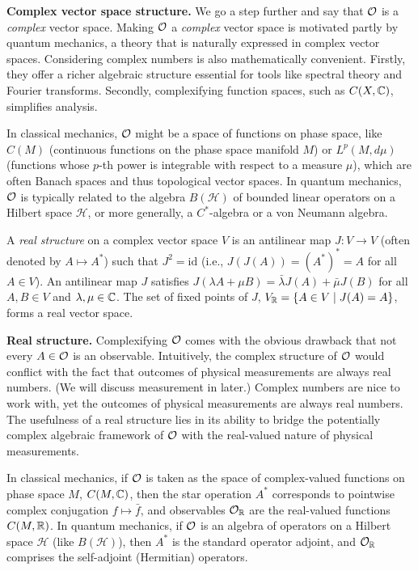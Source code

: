 \textbf{Complex vector space structure.} We go a step further and say that $\mathcal{O}$ is a \emph{complex} vector space.  Making $\mathcal{O}$ a \emph{complex} vector space is motivated partly by quantum mechanics, a theory that is naturally expressed in complex vector spaces. Considering complex numbers is also mathematically convenient. Firstly, they offer a richer algebraic structure essential for tools like spectral theory and Fourier transforms. Secondly, complexifying function spaces, such as $C(X, \mathbb{C})$, simplifies analysis.

\begin{example}
In classical mechanics, $\mathcal{O}$ might be a space of functions on phase space, like $C(M)$ (continuous functions on the phase space manifold $M$) or $L^p(M, d\mu)$ (functions whose $p$-th power is integrable with respect to a measure $\mu$), which are often Banach spaces and thus topological vector spaces. In quantum mechanics, $\mathcal{O}$ is typically related to the algebra $B(\mathcal{H})$ of bounded linear operators on a Hilbert space $\mathcal{H}$, or more generally, a $C^*$-algebra or a von Neumann algebra.
\end{example}

\begin{definition}
A \textit{real structure} on a complex vector space $V$ is an antilinear map $J: V \to V$ (often denoted by $A \mapsto A^*$) such that $J^2 = \text{id}$ (i.e., $J(J(A)) = (A^*)^* = A$ for all $A \in V$). An antilinear map $J$ satisfies $J(\lambda A + \mu B) = \bar{\lambda} J(A) + \bar{\mu} J(B)$ for all $A, B \in V$ and $\lambda, \mu \in \mathbb{C}$. The set of fixed points of $J$, $V_{\mathbb{R}} = \{A \in V \mid J(A) = A\}$, forms a real vector space.
\end{definition}

\textbf{Real structure.} Complexifying $\mathcal{O}$ comes with the obvious drawback that not every $A \in \mathcal{O}$ is an observable. Intuitively, the complex structure of $\mathcal{O}$ would conflict with the fact that outcomes of physical measurements are always real numbers. (We will discuss measurement in later.) Complex numbers are nice to work with, yet the outcomes of physical measurements are always real numbers. The usefulness of a real structure lies in its ability to bridge the potentially complex algebraic framework of $\mathcal{O}$ with the real-valued nature of physical measurements.

\begin{example}
In classical mechanics, if $\mathcal{O}$ is taken as the space of complex-valued functions on phase space $M$, $C(M, \mathbb{C})$, then the star operation $A^*$ corresponds to pointwise complex conjugation $f \mapsto \bar{f}$, and observables $\mathcal{O}_{\mathbb{R}}$ are the real-valued functions $C(M, \mathbb{R})$. In quantum mechanics, if $\mathcal{O}$ is an algebra of operators on a Hilbert space $\mathcal{H}$ (like $B(\mathcal{H})$), then $A^*$ is the standard operator adjoint, and $\mathcal{O}_{\mathbb{R}}$ comprises the self-adjoint (Hermitian) operators.
\end{example}

